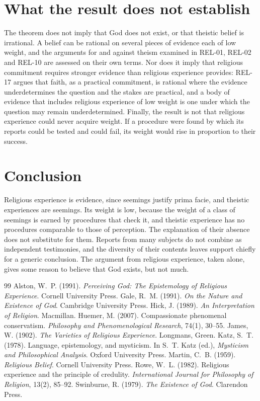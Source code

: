 \documentclass{situationist-preprint}
\begin{document}
\section{What the result does not establish}

The theorem does not imply that God does not exist, or that theistic belief is irrational. A belief can be rational on several pieces of evidence each of low weight, and the arguments for and against theism examined in REL-01, REL-02 and REL-10 are assessed on their own terms. Nor does it imply that religious commitment requires stronger evidence than religious experience provides: REL-17 argues that faith, as a practical commitment, is rational where the evidence underdetermines the question and the stakes are practical, and a body of evidence that includes religious experience of low weight is one under which the question may remain underdetermined. Finally, the result is not that religious experience could never acquire weight. If a procedure were found by which its reports could be tested and could fail, its weight would rise in proportion to their success.

\section{Conclusion}

Religious experience is evidence, since seemings justify prima facie, and theistic experiences are seemings. Its weight is low, because the weight of a class of seemings is earned by procedures that check it, and theistic experience has no procedures comparable to those of perception. The explanation of their absence does not substitute for them. Reports from many subjects do not combine as independent testimonies, and the diversity of their contents leaves support chiefly for a generic conclusion. The argument from religious experience, taken alone, gives some reason to believe that God exists, but not much.

\begin{thebibliography}{99}\small
{} Alston, W.~P. (1991). \emph{Perceiving God: The Epistemology of Religious Experience}. Cornell University Press.
 Gale, R.~M. (1991). \emph{On the Nature and Existence of God}. Cambridge University Press.
 Hick, J. (1989). \emph{An Interpretation of Religion}. Macmillan.
 Huemer, M. (2007). Compassionate phenomenal conservatism. \emph{Philosophy and Phenomenological Research}, 74(1), 30--55.
 James, W. (1902). \emph{The Varieties of Religious Experience}. Longmans, Green.
 Katz, S.~T. (1978). Language, epistemology, and mysticism. In S.~T. Katz (ed.), \emph{Mysticism and Philosophical Analysis}. Oxford University Press.
 Martin, C.~B. (1959). \emph{Religious Belief}. Cornell University Press.
 Rowe, W.~L. (1982). Religious experience and the principle of credulity. \emph{International Journal for Philosophy of Religion}, 13(2), 85--92.
 Swinburne, R. (1979). \emph{The Existence of God}. Clarendon Press.
\end{thebibliography}
\end{document}
